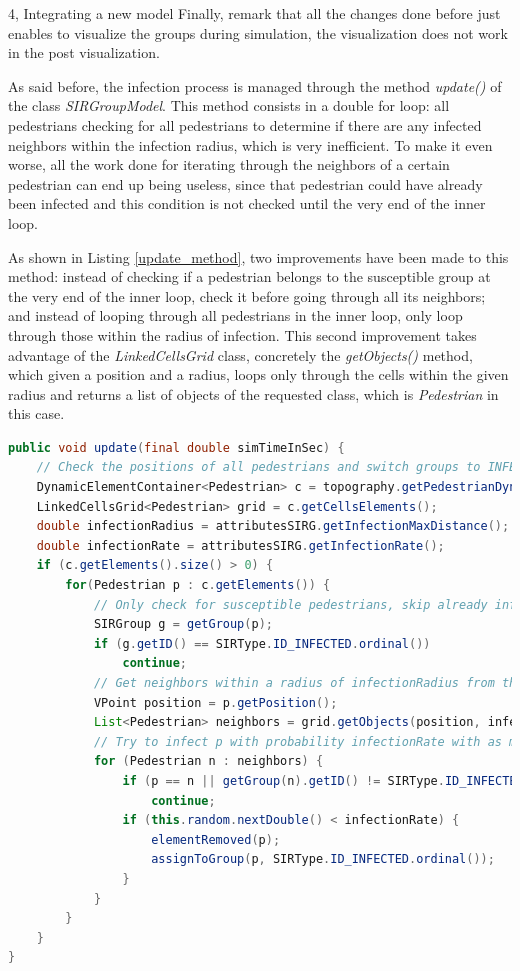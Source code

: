 \documentclass[10pt,a4paper]{article}
\begin{document}
\begin{task}{4, Integrating a new model}
Finally, remark that all the changes done before just enables to visualize the groups during simulation, the visualization does not work in the post visualization.

\bigskip


As said before, the infection process is managed through the method \textit{update()} of the class \textit{SIRGroupModel}. This method consists in a double for loop: all pedestrians checking for all pedestrians to determine if there are any infected neighbors within the infection radius,  which is very inefficient. To make it even worse, all the work done for iterating through the neighbors of a certain pedestrian can end up being useless, since that pedestrian could have already been infected and this condition is not checked until the very end of the inner loop.

As shown in Listing \ref{update_method}, two improvements have been made to this method: instead of checking if a pedestrian belongs to the susceptible group at the very end of the inner loop, check it before going through all its neighbors; and instead of looping through all pedestrians in the inner loop, only loop through those within the radius of infection. This second improvement takes advantage of the \textit{LinkedCellsGrid} class, concretely the \textit{getObjects()} method, which given a position and a radius, loops only through the cells within the given radius and returns a list of objects of the requested class, which is \textit{Pedestrian} in this case.

\begin{lstlisting}[language = Java, caption = Improved version of the infection process, label={update_method}]
public void update(final double simTimeInSec) {
	// Check the positions of all pedestrians and switch groups to INFECTED (or REMOVED).
	DynamicElementContainer<Pedestrian> c = topography.getPedestrianDynamicElements();
	LinkedCellsGrid<Pedestrian> grid = c.getCellsElements();
	double infectionRadius = attributesSIRG.getInfectionMaxDistance();
	double infectionRate = attributesSIRG.getInfectionRate();
	if (c.getElements().size() > 0) {
		for(Pedestrian p : c.getElements()) {
			// Only check for susceptible pedestrians, skip already infected ones
			SIRGroup g = getGroup(p);
			if (g.getID() == SIRType.ID_INFECTED.ordinal())
				continue;
			// Get neighbors within a radius of infectionRadius from the position of the Pedestrian p
			VPoint position = p.getPosition();
			List<Pedestrian> neighbors = grid.getObjects(position, infectionRadius);
			// Try to infect p with probability infectionRate with as many attempts as infected neighbors are there
			for (Pedestrian n : neighbors) {
				if (p == n || getGroup(n).getID() != SIRType.ID_INFECTED.ordinal())
					continue;
				if (this.random.nextDouble() < infectionRate) {
					elementRemoved(p);
					assignToGroup(p, SIRType.ID_INFECTED.ordinal());
				}
			}
		}
	}
}
\end{lstlisting}


\end{task}
\end{document}
